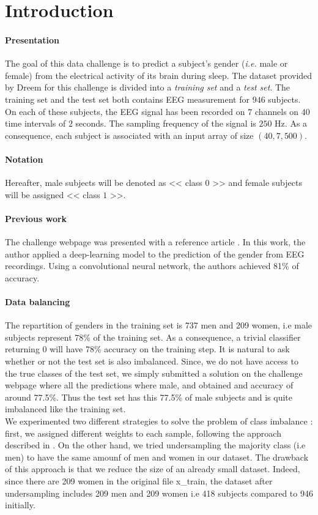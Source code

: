 \section{Introduction}

\paragraph{Presentation}The goal of this data challenge is to predict a subject's gender (\emph{i.e.} male or female) from the electrical activity of its brain during sleep.
The dataset provided by Dreem for this challenge is divided into a \textit{training set} and a \textit{test set}. The training set and the test set both contains EEG measurement for $946$ subjects. On each of these subjects, the EEG signal has been recorded on $7$ channels on $40$ time intervals of $2$ seconds. The sampling frequency of the signal is $250$ Hz. As a consequence, each subject is associated with an input array of size $(40, 7, 500)$.
 
\paragraph{Notation} Hereafter, male subjects will be denoted as << class $0$ >> and female subjects will be assigned << class $1$ >>.

\paragraph{Previous work}

The challenge webpage was presented with a reference article \cite{nature_original}. In this work, the author applied a deep-learning model to the prediction of the gender from EEG recordings. Using a convolutional neural network, the authors achieved 81\% of accuracy. 

\paragraph{Data balancing} The repartition of genders in the training set is 737 men and 209 women, i.e male subjects represent 78\% of the training set. As a consequence, a trivial classifier returning 0 will have 78\% accuracy on the training step. It is natural to ask whether or not the test set is also imbalanced. Since, we do not have access to the true classes of the test set, we simply submitted a solution on the challenge webpage where all the predictions where male, and obtained and accuracy of around 77.5\%. Thus the test set has this 77.5\% of male subjects and is quite imbalanced like the training set. \\
We experimented two different strategies to solve the problem of class imbalance : first, we assigned different weights to each sample, following the approach described in \cite{King2001}. On the other hand, we tried undersampling the majority class (i.e men) to have the same amounf of men and women in our dataset. The drawback of this approach is that we reduce the size of an already small dataset. Indeed, since there are 209 women in the original file x\_train, the dataset after undersampling includes 209 men and 209 women i.e 418 subjects compared to 946 initially. 